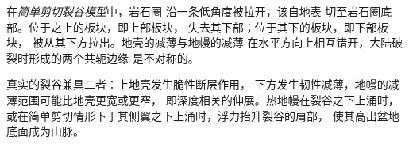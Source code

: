 \begin{definition}[简单剪切裂谷模型]\label{def:b3:extension-strike-slip:rift-models}
在\emph{简单剪切裂谷模型}中，岩石圈
沿一条低角度被拉开，该自地表
切至岩石圈底部。位于之上的板块，即上部板块，
失去其下部；位于其下的板块，即下部板块，
被从其下方拉出。地壳的减薄与地幔的减薄
在水平方向上相互错开，大陆破裂时形成的两个共轭边缘
是不对称的。
\end{definition}

真实的裂谷兼具二者：上地壳发生脆性断层作用，
下方发生韧性减薄，地幔的减薄范围可能比地壳更宽或更窄，
即深度相关的伸展。热地幔在裂谷之下上涌时，
或在简单剪切情形下于其侧翼之下上涌时，浮力抬升裂谷的肩部，
使其高出盆地底面成为山脉。

